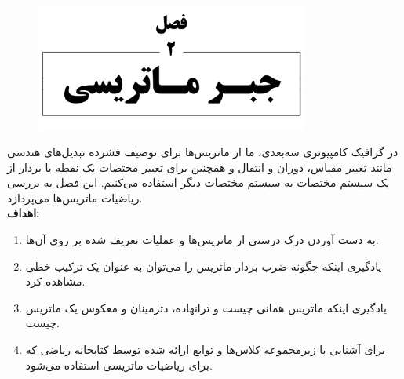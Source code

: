 \newpage

\setcounter{chapter}{2}
\setcounter{section}{0}
\setcounter{point}{0}
\setcounter{eqtn}{0}
\setcounter{exmp}{0}
\setcounter{hint}{0}


\chapter{}
\textbf{\vspace{-140pt}}
\begin{figure}[H]
    \centering
    \setlength{\belowcaptionskip}{-10pt}
    \includegraphics[width=0.8\textwidth]{Images/4/2/4.Session.1.2.0}
    \label{fig:4.Session.1.2.0}
\end{figure}
\textbf{\vspace{20pt}}
{
    \Large
    \begin{spacing}{1.5}
        در گرافیک کامپیوتری سه‌بعدی، ما از ماتریس‌ها برای توصیف فشرده تبدیل‌های هندسی مانند تغییر مقیاس، دوران و انتقال و همچنین برای تغییر مختصات یک نقطه یا بردار از یک سیستم مختصات به سیستم مختصات دیگر استفاده می‌کنیم.
        این فصل به بررسی ریاضیات ماتریس‌ها می‌پردازد.
        \\

        \textbf{\LARGE \hspace{-40pt}اهداف:}
        \begin{enumerate}[label=\textbf{\arabic*}.]
            \item {به دست آوردن درک درستی از ماتریس‌ها و عملیات تعریف شده بر روی آن‌ها.}
            \item {یادگیری اینکه چگونه ضرب بردار-ماتریس را می‌توان به عنوان یک ترکیب خطی مشاهده کرد.}
            \item {یادگیری اینکه ماتریس همانی چیست و ترانهاده، دترمینان و معکوس یک ماتریس چیست.}
            \item {برای آشنایی با زیرمجموعه کلاس‌ها و توابع ارائه شده توسط کتابخانه ریاضی  که برای ریاضیات ماتریسی استفاده می‌شود.}
        \end{enumerate}
    \end{spacing}
}
\newpage

